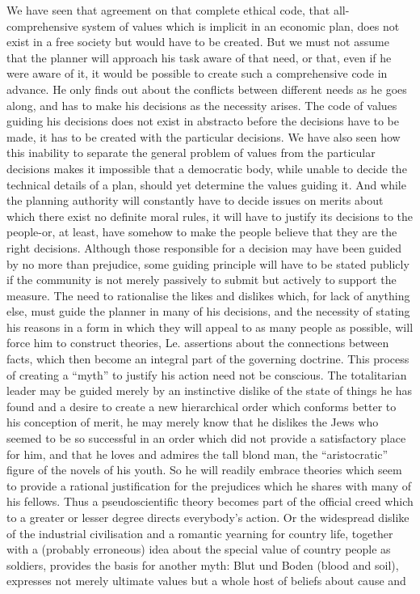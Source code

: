 \documentclass[11pt,openany]{book}
\begin{document}
\begin{center}\textasteriskcentered\hspace{0.9em}\textasteriskcentered\hspace{0.9em}\textasteriskcentered\end{center}

We have seen that agreement on that complete ethical code, that all-comprehensive system of values which is implicit in an economic plan, does not exist in a free society but would have to be created. But we must not assume that the planner will approach his task aware of that need, or that, even if he were aware of it, it would be possible to create such a comprehensive code in advance. He only finds out about the conflicts between different needs as he goes along, and has to make his decisions as the necessity arises. The code of values guiding his decisions does not exist in abstracto before the decisions have to be made, it has to be created with the particular decisions. We have also seen how this inability to separate the general problem of values from the particular decisions makes it impossible that a democratic body, while unable to decide the technical details of a plan, should yet determine the values guiding it. And while the planning authority will constantly have to decide issues on merits about which there exist no definite moral rules, it will have to justify its decisions to the people-or, at least, have somehow to make the people believe that they are the right decisions. Although those responsible for a decision may have been guided by no more than prejudice, some guiding principle will have to be stated publicly if the community is not merely passively to submit but actively to support the measure. The need to rationalise the likes and dislikes which, for lack of anything else, must guide the planner in many of his decisions, and the necessity of stating his reasons in a form in which they will appeal to as many people as possible, will force him to construct theories, Le. assertions about the connections between facts, which then become an integral part of the governing doctrine. This process of creating a ``myth'' to justify his action need not be conscious. The totalitarian leader may be guided merely by an instinctive dislike of the state of things he has found and a desire to create a new hierarchical order which conforms better to his conception of merit, he may merely know that he dislikes the Jews who seemed to be so successful in an order which did not provide a satisfactory place for him, and that he loves and admires the tall blond man, the ``aristocratic'' figure of the novels of his youth. So he will readily embrace theories which seem to provide a rational justification for the prejudices which he shares with many of his fellows. Thus a pseudoscientific theory becomes part of the official creed which to a greater or lesser degree directs everybody's action. Or the widespread dislike of the industrial civilisation and a romantic yearning for country life, together with a (probably erroneous) idea about the special value of country people as soldiers, provides the basis for another myth: Blut und Boden (blood and soil), expresses not merely ultimate values but a whole host of beliefs about cause and 
\end{document}

